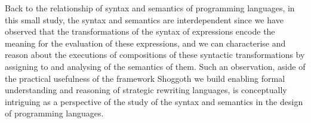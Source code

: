 Back to the relationship of syntax and semantics of programming languages, in this small study, the syntax and semantics are interdependent since we have observed that the transformations of the syntax of expressions encode the meaning for the evaluation of these expressions, and we can characterise and reason about the executions of compositions of these syntactic transformations by assigning to and analysing of the semantics of them. Such an observation, aside of the practical usefulness of the framework Shoggoth we build enabling formal understanding and reasoning of strategic rewriting languages, is conceptually intriguing as a perspective of the study of the syntax and semantics in the design of programming languages.

